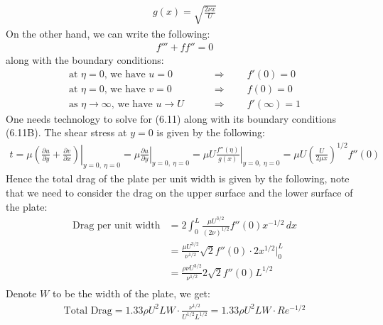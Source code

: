 \documentclass[11pt]{book}
\theoremstyle{break}
\theoremstyle{break}
\newcommand{\pd}{\partial}
\begin{document}
\begin{align*}
g(x) = \sqrt{\frac{2\nu x}{U}}
\end{align*}
On the other hand, we can write the following:
\begin{align}
f''' + ff'' = 0
\end{align}
along with the boundary conditions:
\begin{align*}
\text{at $\eta = 0$, we have }u = 0 \qquad &\Rightarrow \qquad f'(0)= 0 \\
\text{at $\eta = 0$, we have }v = 0 \qquad &\Rightarrow \qquad f(0)= 0 \tag{6.11B}\\
\text{as $\eta \to \infty$, we have }u \to U \qquad &\Rightarrow \qquad f'(\infty)= 1   
\end{align*}
One needs technology to solve for (6.11) along with its boundary conditions (6.11B). The shear stress at $y = 0$ is given by the following:
\begin{align*}
t = \mu\left. \left( \frac{\pd u}{\pd y} + \frac{\pd v}{\pd x}\right)\right|_{y=0,\ \eta = 0} = \mu \left.\frac{\pd u}{\pd y}\right|_{y=0,\ \eta = 0} = \left.\mu U\frac{f''(\eta)}{g(x)}\right|_{y=0,\ \eta =0} = \mu U \left( \frac{U}{2\mu x}\right)^{1/2}f''(0)
\end{align*}
Hence the total drag of the plate per unit width is given by the following, note that we need to consider the drag on the upper surface and the lower surface of the plate:
\begin{align*}
\text{Drag per unit width}
&= 2 \int_0^L \frac{\mu U^{3/2}}{(2\nu)^{1/2}} f''(0) x^{-1/2}\, dx \\
&= \frac{\mu U^{3/2}}{\nu^{1/2}}\sqrt{2}f''(0) \cdot 2x^{1/2}|^L_0 \\
&= \frac{\rho \nu U^{3/2}}{\nu^{1/2}} 2\sqrt{2}f''(0) L^{1/2}\\
\end{align*}
Denote $W$ to be the width of the plate, we get:
\begin{align*}
\text{Total Drag} = 1.33 \rho U^2 L W \cdot \frac{\nu^{1/2}}{U^{1/2}L^{1/2}} =1.33 \rho U^2 L W \cdot Re^{-1/2} 
\end{align*}
\hfill\break
\hfill\break
\end{document}
